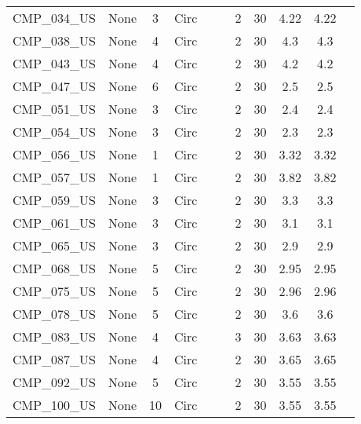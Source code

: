 \begin{table}[]
\begin{tabular}{@{}lcccccccccc@{}}
CMP\_034\_US  & None       & 3        & Circ &        &       & 2        & 30     & 4.22      & 4.22       \\
CMP\_038\_US  & None       & 4        & Circ &        &       & 2        & 30     & 4.3       & 4.3        \\
CMP\_043\_US  & None       & 4        & Circ &        &       & 2        & 30     & 4.2       & 4.2        \\
CMP\_047\_US  & None       & 6        & Circ &        &       & 2        & 30     & 2.5       & 2.5        \\
CMP\_051\_US  & None       & 3        & Circ &        &       & 2        & 30     & 2.4       & 2.4        \\
CMP\_054\_US  & None       & 3        & Circ &        &       & 2        & 30     & 2.3       & 2.3        \\
CMP\_056\_US  & None       & 1        & Circ &        &       & 2        & 30     & 3.32      & 3.32       \\
CMP\_057\_US  & None       & 1        & Circ &        &       & 2        & 30     & 3.82      & 3.82       \\
CMP\_059\_US  & None       & 3        & Circ &        &       & 2        & 30     & 3.3       & 3.3        \\
CMP\_061\_US  & None       & 3        & Circ &        &       & 2        & 30     & 3.1       & 3.1        \\
CMP\_065\_US  & None       & 3        & Circ &        &       & 2        & 30     & 2.9       & 2.9        \\
CMP\_068\_US  & None       & 5        & Circ &        &       & 2        & 30     & 2.95      & 2.95       \\
CMP\_075\_US  & None       & 5        & Circ &        &       & 2        & 30     & 2.96      & 2.96       \\
CMP\_078\_US  & None       & 5        & Circ &        &       & 2        & 30     & 3.6       & 3.6        \\
CMP\_083\_US  & None       & 4        & Circ &        &       & 3        & 30     & 3.63      & 3.63       \\
CMP\_087\_US  & None       & 4        & Circ &        &       & 2        & 30     & 3.65      & 3.65       \\
CMP\_092\_US  & None       & 5        & Circ &        &       & 2        & 30     & 3.55      & 3.55       \\
CMP\_100\_US  & None       & 10       & Circ &        &       & 2        & 30     & 3.55      & 3.55       \\

\end{tabular}
\end{table}
